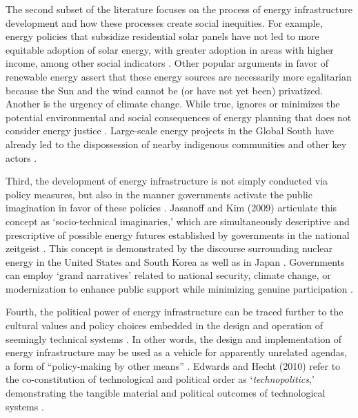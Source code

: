 The second subset of the literature focuses on the process of energy
infrastructure development and how these processes create social inequities. For
example, energy policies that subsidize residential solar panels have not led to
more equitable adoption of solar energy, with greater adoption in areas with
higher income, among other social indicators \cite{reames_distributional_2020}.
Other popular arguments in favor of renewable energy assert that these energy
sources are necessarily more egalitarian because the Sun and the wind cannot be
(or have not yet been) privatized. Another is the urgency of climate change.
While true, ignores or minimizes the potential environmental and social
consequences of energy planning that does not consider energy justice
\cite{jones_building_2013}. Large-scale energy projects in the Global South have
already led to the dispossession of nearby indigenous communities and other key
actors \cite{yenneti_spatial_2016, barragan-contreras_procedural_2022}.

Third, the development of energy infrastructure is not simply conducted via
policy measures, but also in the manner governments activate the public
imagination in favor of these policies
\cite{bridge_energy_2018,jasanoff_containing_2009}. Jasanoff and Kim (2009)
articulate this concept as `socio-technical imaginaries,' which are
simultaneously descriptive and prescriptive of possible energy futures
established by governments in the national zeitgeist
\cite{jasanoff_containing_2009}. This concept is demonstrated by the discourse
surrounding nuclear energy in the United States and South Korea
\cite{jasanoff_containing_2009} as well as in Japan
\cite{valentine_energy_2019}. Governments can employ `grand narratives' related
to national security, climate change, or modernization to enhance public support
while minimizing genuine participation \cite{bridge_energy_2018}.

Fourth, the political power of energy infrastructure can be traced further to
the cultural values and policy choices embedded in the design and operation of
seemingly technical systems \cite{bridge_energy_2018}. In other words, the
design and implementation of energy infrastructure may be used as a vehicle for
apparently unrelated agendas, a form of ``policy-making by other means''
\cite{bridge_energy_2018, clausewitz_chapter_1918}. Edwards and Hecht (2010)
refer to the co-constitution of technological and political order as
`\textit{technopolitics},' demonstrating the tangible material and political
outcomes of technological systems \cite{edwards_history_2010}.

